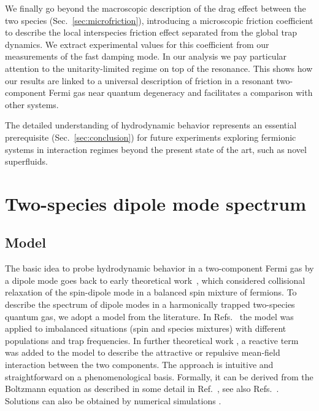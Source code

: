 We finally go beyond the macroscopic description of the drag effect between the two species (Sec.~\ref{sec:microfriction}), introducing a microscopic friction coefficient {to describe the local interspecies friction effect separated from the global trap dynamics. We extract experimental values for this coefficient} from our measurements of the fast damping mode. In our analysis we pay particular attention to the unitarity-limited regime on top of the resonance.
{This shows how our results are linked to a universal description of friction in a resonant two-component Fermi gas near quantum degeneracy and facilitates a comparison with other systems.}

The detailed understanding of hydrodynamic behavior represents an essential prerequisite (Sec.~\ref{sec:conclusion}) for future experiments exploring fermionic systems in interaction regimes beyond the present state of the art, such as novel superfluids.


\section{Two-species dipole mode spectrum}\label{sec:modespectrum}

\subsection{Model}
\label{ssec:model}

The basic idea to probe hydrodynamic behavior in a two-component Fermi gas by a dipole mode goes back to early theoretical work~\cite{Vichi1999coo}, which considered collisional relaxation of the spin-dipole mode in a balanced spin mixture of fermions.
To describe the spectrum of dipole modes in a harmonically trapped two-species quantum gas, we adopt a model from the literature.  In Refs.~\cite{Gensemer2001tfc, Ferlaino2003doi} %
the model was applied to imbalanced situations (spin and species mixtures) with different populations and trap frequencies. In further theoretical work \cite{Chiacchiera2010doi, Asano2020doo}, a reactive term was added to the model to describe the attractive or repulsive mean-field interaction between the two components. The approach is intuitive and straightforward on a phenomenological basis. Formally, it can be derived from the Boltzmann equation as described in some detail in Ref.~\cite{Chiacchiera2010doi}, see also Refs.~\cite{Vichi1999coo, Narushima2018das, Asano2020doo}.
{Solutions can also be obtained by numerical simulations \cite{Lepers2010nso, Goulko2012bes}.}


